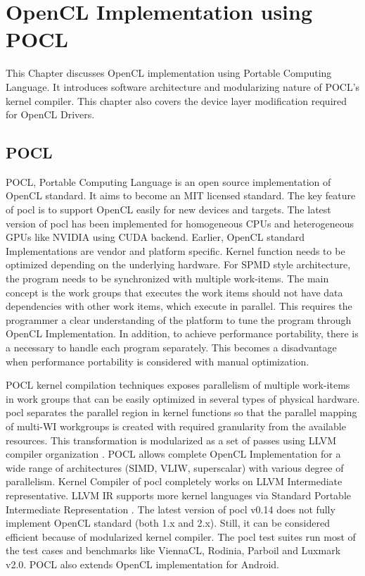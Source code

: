 \chapter{OpenCL Implementation using POCL}
\label{ch3_OpenCL_Implementation_using_POCL}

This Chapter discusses OpenCL implementation using Portable Computing Language. It introduces software architecture and modularizing nature of POCL’s kernel compiler. This chapter also covers the device layer modification required for OpenCL Drivers.

\section{POCL}
POCL, Portable Computing Language is an open source implementation of OpenCL standard. It aims to become an MIT licensed standard. The key feature of pocl is to support OpenCL easily for new devices and targets. The latest version of pocl has been implemented for homogeneous CPUs and heterogeneous GPUs like NVIDIA using CUDA backend. Earlier, OpenCL standard Implementations are vendor and platform specific. Kernel function needs to be optimized depending on the underlying hardware. For SPMD style architecture, the program needs to be synchronized with multiple work-items. The main concept is the work groups that executes the work items should not have data dependencies with other work items, which execute in parallel. This requires the programmer a clear understanding of the platform to tune the program through OpenCL Implementation. In addition, to achieve performance portability, there is a necessary to handle each program separately. This becomes a disadvantage when performance portability is considered with manual optimization.

POCL kernel compilation techniques exposes parallelism of multiple work-items in work groups that can be easily optimized in several types of physical hardware. pocl separates the parallel region in kernel functions so that the parallel mapping of multi-WI workgroups is created with required granularity from the available resources. This transformation is modularized as a set of passes using LLVM compiler organization \cite{16}. POCL allows complete OpenCL Implementation for a wide range of architectures (SIMD, VLIW, superscalar) with various degree of parallelism. Kernel Compiler of pocl completely works on LLVM Intermediate representative. LLVM IR supports more kernel languages via Standard Portable Intermediate Representation \cite{17}. The latest version of pocl v0.14 does not fully implement OpenCL standard (both 1.x and 2.x). Still, it can be considered efficient because of modularized kernel compiler. The pocl test suites run most of the test cases and benchmarks like ViennaCL, Rodinia, Parboil and Luxmark v2.0. POCL also extends OpenCL implementation for Android.

